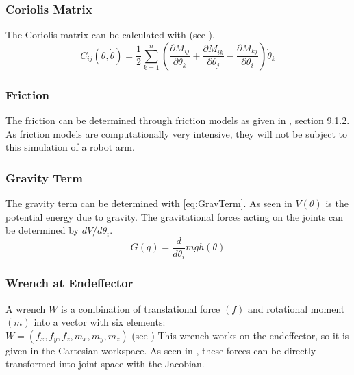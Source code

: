 \subsubsection{Coriolis Matrix}
The Coriolis matrix can be calculated with  (see \cite{MathIntroRobManip}).%
\begin{equation}\label{eq:CoriolisMatr}
	C_{ij}(\theta,\dot{\theta}) = %
	\frac{1}{2} \sum_{k=1}^{n} (\frac{\partial M_{ij}}{\partial\theta_k}+\frac{\partial M_{ik}}{\partial\theta_j}-\frac{\partial M_{kj}}{\partial\theta_i})\dot{\theta}_k
\end{equation}

\subsubsection{Friction}
The friction can be determined through friction models as given in  \cite{CorkeRoboticVisionControl}, section 9.1.2.
As friction models are computationally very intensive, they will not be subject to this simulation of a robot arm.

\subsubsection{Gravity Term}
The gravity term can be determined with \autoref{eq:GravTerm}. As seen in   $V (\theta)$ is the potential energy due to gravity. The gravitational forces acting on the joints can be determined by $dV/d\theta_i$. %
\begin{equation} \label{eq:GravTerm}
	G(q) = \frac{d}{d\theta_i} mgh(\theta)
\end{equation}

\subsubsection{Wrench at Endeffector}
A wrench $W$ is a combination of translational force $(f)$ and rotational moment $(m)$ into a vector with six elements:\\
$ W = (f_x, f_y, f_z, m_x, m_y, m_z)$ (see \cite{CorkeRoboticVisionControl})%
This wrench works on the \gls{endeffector}, so it is given in the Cartesian workspace.
As seen in , these forces can be directly transformed into joint space with the Jacobian.










